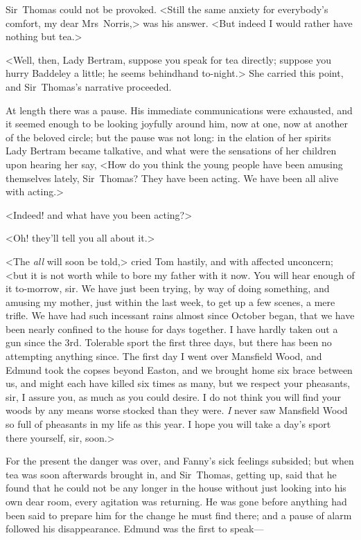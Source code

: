 Sir~Thomas could not be provoked. <Still the same anxiety for everybody's comfort, my dear Mrs~Norris,> was his answer. <But indeed I would rather have nothing but tea.>

<Well, then, Lady Bertram, suppose you speak for tea directly; suppose you hurry Baddeley a little; he seems behindhand to-night.> She carried this point, and Sir~Thomas's narrative proceeded.

At length there was a pause. His immediate communications were exhausted, and it seemed enough to be looking joyfully around him, now at one, now at another of the beloved circle; but the pause was not long: in the elation of her spirits Lady Bertram became talkative, and what were the sensations of her children upon hearing her say, <How do you think the young people have been amusing themselves lately, Sir~Thomas? They have been acting. We have been all alive with acting.>

<Indeed! and what have you been acting?>

<Oh! they'll tell you all about it.>

<The \textit{all}  will soon be told,> cried Tom hastily, and with affected unconcern; <but it is not worth while to bore my father with it now. You will hear enough of it to-morrow, sir. We have just been trying, by way of doing something, and amusing my mother, just within the last week, to get up a few scenes, a mere trifle. We have had such incessant rains almost since October began, that we have been nearly confined to the house for days together. I have hardly taken out a gun since the 3rd. Tolerable sport the first three days, but there has been no attempting anything since. The first day I went over Mansfield Wood, and Edmund took the copses beyond Easton, and we brought home six brace between us, and might each have killed six times as many, but we respect your pheasants, sir, I assure you, as much as you could desire. I do not think you will find your woods by any means worse stocked than they were. \textit{I}  never saw Mansfield Wood so full of pheasants in my life as this year. I hope you will take a day's sport there yourself, sir, soon.>

For the present the danger was over, and Fanny's sick feelings subsided; but when tea was soon afterwards brought in, and Sir~Thomas, getting up, said that he found that he could not be any longer in the house without just looking into his own dear room, every agitation was returning. He was gone before anything had been said to prepare him for the change he must find there; and a pause of alarm followed his disappearance. Edmund was the first to speak—

